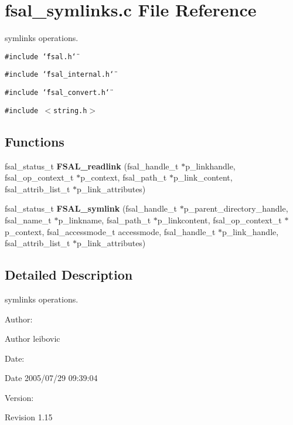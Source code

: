 \section{fsal\_\-symlinks.c File Reference}
\label{fsal__symlinks_8c}
symlinks operations.  


{\tt \#include \char`\"{}fsal.h\char`\"{}}\par
{\tt \#include \char`\"{}fsal\_\-internal.h\char`\"{}}\par
{\tt \#include \char`\"{}fsal\_\-convert.h\char`\"{}}\par
{\tt \#include $<$string.h$>$}\par
\subsection*{Functions}
\begin{CompactItemize}
\item 
fsal\_\-status\_\-t {\bf FSAL\_\-readlink} (fsal\_\-handle\_\-t $\ast$p\_\-linkhandle, fsal\_\-op\_\-context\_\-t $\ast$p\_\-context, fsal\_\-path\_\-t $\ast$p\_\-link\_\-content, fsal\_\-attrib\_\-list\_\-t $\ast$p\_\-link\_\-attributes)
\item 
fsal\_\-status\_\-t {\bf FSAL\_\-symlink} (fsal\_\-handle\_\-t $\ast$p\_\-parent\_\-directory\_\-handle, fsal\_\-name\_\-t $\ast$p\_\-linkname, fsal\_\-path\_\-t $\ast$p\_\-linkcontent, fsal\_\-op\_\-context\_\-t $\ast$p\_\-context, fsal\_\-accessmode\_\-t accessmode, fsal\_\-handle\_\-t $\ast$p\_\-link\_\-handle, fsal\_\-attrib\_\-list\_\-t $\ast$p\_\-link\_\-attributes)
\end{CompactItemize}


\subsection{Detailed Description}
symlinks operations. 

\begin{Desc}
\item[Author:]\end{Desc}
\begin{Desc}
\item[Author]leibovic \end{Desc}
\begin{Desc}
\item[Date:]\end{Desc}
\begin{Desc}
\item[Date]2005/07/29 09:39:04 \end{Desc}
\begin{Desc}
\item[Version:]\end{Desc}
\begin{Desc}
\item[Revision]1.15 \end{Desc}


